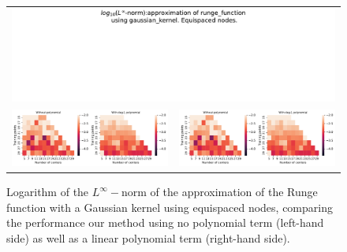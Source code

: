 \documentclass[12pt]{report} %
\begin{document}
\begin{figure}[h]
  \begin{tabular}{cc}
    \multicolumn{2}{c}{{\includegraphics[width=\textwidth, trim={0 5.5cm 0 0},clip=true]
    {imagenes/experiments/1d/variational/linf_runge_function_gaussian_kernel_Equi_Poly_Title.pdf}}}                                                                                       \\
    {\includegraphics[height=.4\textwidth, trim={0 0 11.5cm 0},clip=true]
    {imagenes/experiments/1d/variational/linf_runge_function_gaussian_kernel_Equi_Poly_Comparison.pdf}}  &
     {\includegraphics[height=.4\textwidth, trim={9.52cm 0 0 0},clip=true]{imagenes/experiments/1d/variational/linf_runge_function_gaussian_kernel_Equi_Poly_Comparison.pdf}} \\
  \end{tabular}
  \caption{Logarithm of the $L^\infty-$norm of the approximation of the Runge function with a Gaussian kernel using equispaced nodes, comparing the performance our method using no polynomial term (left-hand side) as well as a linear polynomial term (right-hand side).}
  \label{fig:runge-gaussian-comparison-poly-equi}
\end{figure}
\end{document}
